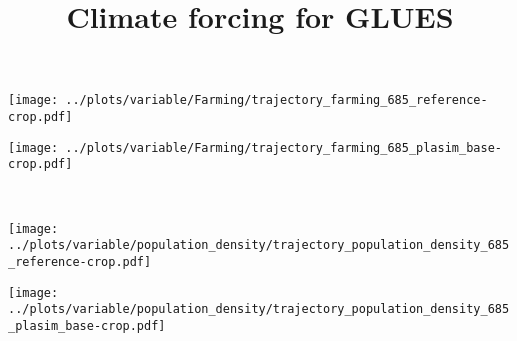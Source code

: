 \documentclass{scrartcl}
\title{Climate forcing for GLUES}
\begin{document}
\parbox{0.5\hsize}{\texttt{[image: ../plots/variable/Farming/trajectory\_farming\_685\_reference-crop.pdf]}}%
\parbox{0.5\hsize}{\texttt{[image: ../plots/variable/Farming/trajectory\_farming\_685\_plasim\_base-crop.pdf]}}\\
\parbox{0.5\hsize}{\texttt{[image: ../plots/variable/population\_density/trajectory\_population\_density\_685\_reference-crop.pdf]}}%
\parbox{0.5\hsize}{\texttt{[image: ../plots/variable/population\_density/trajectory\_population\_density\_685\_plasim\_base-crop.pdf]}}
\end{document}
